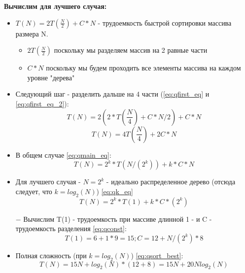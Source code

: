 \textbf{Вычислим для лучшего случая:}
\begin{itemize}
    \item $T(N) = 2T(\frac{N}{2}) + C*N$ - трудоемкость быстрой сортировки массива размера N.
    \begin{itemize}
        \item $2T(\frac{N}{2})$ поскольку мы разделяем массив на 2 равные части
        \item $C*N$ поскольку мы будем проходить все элементы массива на каждом уровне "дерева"
    \end{itemize}
    \item Следующий шаг - разделить дальше на 4 части (\eqref{eq:qfirst_eq} и \eqref{eq:qfirst_eq_2}):
    \begin{equation}
        \label{eq:qfirst_eq}
        T(N) = 2(2*T(\frac{N}{4}) + C*N/2) + C*N
    \end{equation}
    \begin{equation}
        \label{eq:qfirst_eq_2}
        T(N) = 4T(\frac{N}{4}) + 2C*N
    \end{equation}
    \item В общем случае \eqref{eq:qmain_eq}:
    \begin{equation}
        \label{eq:qmain_eq}
        T(N) = 2^k * T(N/(2^k)) + k*C*N
    \end{equation}
    \item Для лучшего случая - $N = 2^k$ - идеально распределенное дерево (отсюда следует, что $k = log_2(N)$) \eqref{eq:qk_eq}
    \begin{equation}
        \label{eq:qk_eq}
        T(N) = 2^k * T(1) + k * C * (2^k)
    \end{equation}
    \item[$-$] Вычислим T(1) - трудоемкость при массиве длинной 1 - и C - трудоемкость разделения \eqref{eq:qconst}:
    \begin{equation}
        \label{eq:qconst}
        T(1) = 6 + 1 * 9 = 15;
        C = 12 + N / (2^k) * 8
    \end{equation}
    \item Полная сложность (при $k = log_2(N)$) \eqref{eq:qsort_best}:
    \begin{equation}
        \label{eq:qsort_best}
        T(N) = 15N + log_2(N)*(12 + 8) = 15N + 20Nlog_2(N)
    \end{equation}
\end{itemize}

